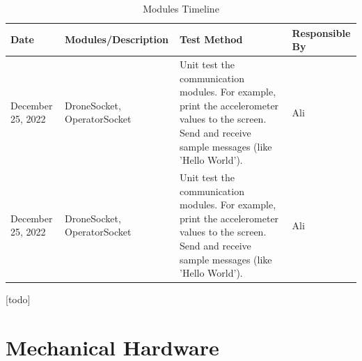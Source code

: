 \documentclass[12pt, titlepage]{article}
\begin{document}
\begin{table}[!h]
\begin{center}
\caption {Modules Timeline}
\label{tab:moduleTimeline}
\begin{tabular}{ | m{2.5cm} | m{7.5cm} | m{3cm} | m{2cm} | } 
\hline
Date & Modules/Description & Test Method & Responsible By \\
\hline
December 25, 2022 & DroneSocket, OperatorSocket & 
    Unit test the communication modules. For example, print the accelerometer values to the screen. Send and receive sample messages (like 'Hello World'). & Ali \\
\hline
December 25, 2022 & DroneSocket, OperatorSocket & 
    Unit test the communication modules. For example, print the accelerometer values to the screen. Send and receive sample messages (like 'Hello World'). & Ali \\
\hline
\end{tabular}
\end{center}
\end{table}

[todo]

\clearpage

% 

\newpage{}

\appendix

\section{Mechanical Hardware}
\label{sec:mechHardwareAppendix}
\end{document}
